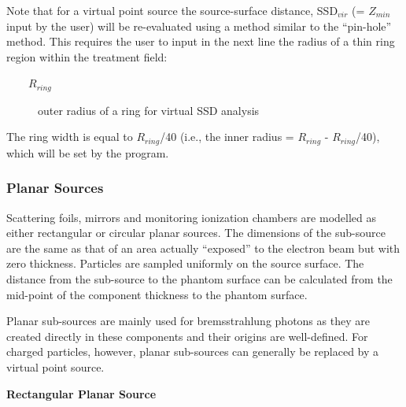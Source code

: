 \documentclass[12pt,twoside]{article}
\begin{document}
Note that for a virtual point source the source-surface distance, SSD$_{vir}$ (= $Z_{min}$ input by the user) will be re-evaluated using a method similar to the ``pin-hole'' method\cite{Ma95c}. This requires the user to input in the next line the radius of a thin ring region within the treatment field:

\begin{description}
\item [~~~~$R_{ring}$] outer radius of a  ring for virtual SSD analysis
\end{description}

The ring width is equal to $R_{ring}$/40 (i.e., the inner radius = $R_{ring}$ - $R_{ring}$/40), which will be set by the program.

\subsubsection{Planar Sources}
Scattering foils, mirrors and monitoring ionization chambers are modelled
as either rectangular or circular planar sources. The dimensions of the
sub-source are the same as that of an area actually ``exposed'' to the
electron beam but with zero thickness. Particles are sampled uniformly on
the source surface. The distance from the sub-source to the phantom
surface can be calculated from the mid-point of the component thickness to
the phantom surface.

Planar sub-sources are mainly used for bremsstrahlung photons as they are
created directly in these components and their origins are well-defined.
For charged particles, however, planar sub-sources can generally be
replaced by a virtual point source.

{\bf Rectangular Planar Source}
\end{document}
